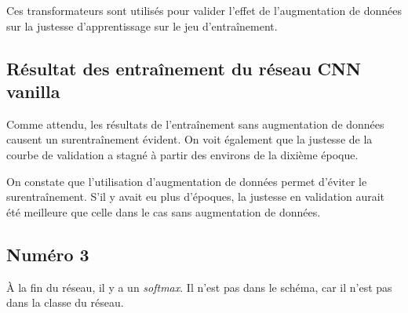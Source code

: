     Ces transformateurs sont utilisés pour valider l'effet de l'augmentation de données sur la justesse d'apprentissage sur le jeu d'entraînement.
    
\subsection{Résultat des entraînement du réseau CNN vanilla}
    Comme attendu, les résultats de l'entraînement sans augmentation de données causent un surentraînement évident. On voit également que la justesse de la courbe de validation a stagné à partir des environs de la dixième époque.
    \begin{figure}[H]
        \centering 
        \caption{ }
    \end{figure}
    \begin{figure}[H]
        \centering 
        \caption{ }
    \end{figure}
    
    On constate que l'utilisation d'augmentation de données permet d'éviter le surentraînement. S'il y avait eu plus d'époques, la justesse en validation aurait été meilleure que celle dans le cas sans augmentation de données.
    \begin{figure}[H]
        \centering 
        \caption{ }
    \end{figure}
    \begin{figure}[H]
        \centering 
        \caption{ }
    \end{figure}

\begin{landscape}
    \section{Numéro 3}
        À la fin du réseau, il y a un \textit{softmax}. Il n'est pas dans le schéma, car il n'est pas dans la classe du réseau.
        \begin{figure}[H]
            \centering 
            \caption{ }
        \end{figure}
    
        \begin{figure}[H]
            \centering 
            \caption{ }
        \end{figure}
    
        \begin{figure}[H]
            \centering 
            \caption{ }
        \end{figure}
    
        \begin{figure}[H]
            \centering 
            \caption{ }
        \end{figure}    
\end{landscape}

